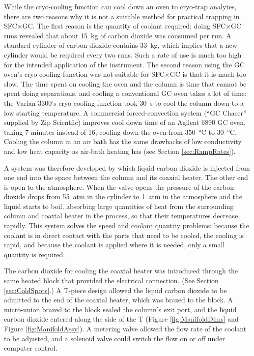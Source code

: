While the cryo-cooling function can cool down an oven to cryo-trap analytes,
there are two reasons why it is not a suitable method for practical trapping in
SFC×GC. The first reason is the quantity of coolant required: doing SFC×GC runs
revealed that about \SI{15}{\kilogram} of carbon dioxide was consumed per run. A
standard cylinder of carbon dioxide contains \SI{33}{\kilogram}, which implies
that a new cylinder would be required every two runs. Such a rate of use is much
too high for the intended application of the instrument. The second reason using
the GC oven's cryo-cooling function was not suitable for SFC×GC is that it is
much too slow. The time spent on cooling the oven and the column is time that
cannot be spent doing separations, and cooling a conventional GC oven takes a
lot of time: the Varian 3300's cryo-cooling function took \SI{30}{\second} to
cool the column down to a low starting temperature. A commercial
forced-convection system (``GC Chaser'' supplied by Zip Scientfic) improves cool
down time of an Agilent 6890 GC oven, taking 7 minutes instead of 16, cooling
down the oven from \SI{350}{\celsius} to \SI{30}{\celsius}. Cooling the
column in an air bath has the same drawbacks of low conductivity and low heat
capacity as air-bath heating has (see Section \ref{sec:RampRates}).

A system was therefore developed by which liquid carbon dioxide is injected from
one end into the space between the column and its coaxial heater. The other end
is open to the atmosphere. When the valve opens the pressure of the carbon
dioxide drops from \SI{55}{atm} in the cylinder to \SI{1}{atm} in the atmosphere
and the liquid starts to boil, absorbing large quantities of heat from the
surrounding column and coaxial heater in the process, so that their temperatures
decrease rapidly. This system solves the speed and coolant quantity problems:
because the coolant is in direct contact with the parts that need to be cooled,
the cooling is rapid, and because the coolant is applied where it is needed,
only a small quantity is required.

The carbon dioxide for cooling the coaxial heater was introduced through the
same heated block that provided the electrical connection. (See Section
\ref{sec:ColdSpots}.) A T-piece design allowed the liquid carbon dioxide to be
admitted to the end of the coaxial heater, which was brazed to the block. A
micro-union brazed to the block sealed the column's exit port, and the liquid
carbon dioxide entered along the side of the T (Figure \ref{fig:ManifoldDims}
and Figure \ref{fig:ManifoldAssy}). A metering valve allowed the flow rate of
the coolant to be adjusted, and a solenoid valve could switch the flow on or off
under computer control.

